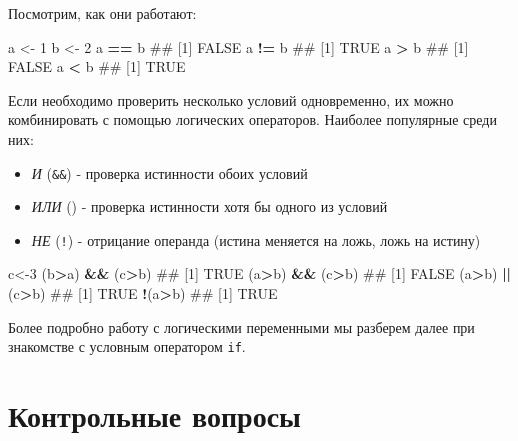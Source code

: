 \documentclass[]{book}
\newenvironment{Shaded}{\begin{snugshade}}{\end{snugshade}}
\newcommand{\DecValTok}[1]{\textcolor[rgb]{0.00,0.00,0.81}{#1}}
\newcommand{\StringTok}[1]{\textcolor[rgb]{0.31,0.60,0.02}{#1}}
\newcommand{\OperatorTok}[1]{\textcolor[rgb]{0.81,0.36,0.00}{\textbf{#1}}}
\newcommand{\NormalTok}[1]{#1}
\providecommand{\tightlist}{%
  \setlength{\itemsep}{0pt}\setlength{\parskip}{0pt}}
\begin{document}
Посмотрим, как они работают:

\begin{Shaded}
\begin{Highlighting}[]
\NormalTok{a <-}\StringTok{ }\DecValTok{1}
\NormalTok{b <-}\StringTok{ }\DecValTok{2}
\NormalTok{a }\OperatorTok{==}\StringTok{ }\NormalTok{b}
\NormalTok{## [1] FALSE}
\NormalTok{a }\OperatorTok{!=}\StringTok{ }\NormalTok{b}
\NormalTok{## [1] TRUE}
\NormalTok{a }\OperatorTok{>}\StringTok{ }\NormalTok{b}
\NormalTok{## [1] FALSE}
\NormalTok{a }\OperatorTok{<}\StringTok{ }\NormalTok{b}
\NormalTok{## [1] TRUE}
\end{Highlighting}
\end{Shaded}

Если необходимо проверить несколько условий одновременно, их можно
комбинировать с помощью логических операторов. Наиболее популярные среди
них:

\begin{itemize}
\tightlist
\item
  \emph{И} (\texttt{\&\&}) - проверка истинности обоих условий
\item
  \emph{ИЛИ} (\texttt{\textbar{}\textbar{}}) - проверка истинности хотя
  бы одного из условий
\item
  \emph{НЕ} (\texttt{!}) - отрицание операнда (истина меняется на ложь,
  ложь на истину)
\end{itemize}

\begin{Shaded}
\begin{Highlighting}[]
\NormalTok{c<-}\DecValTok{3}
\NormalTok{(b}\OperatorTok{>}\NormalTok{a) }\OperatorTok{&&}\StringTok{ }\NormalTok{(c}\OperatorTok{>}\NormalTok{b)}
\NormalTok{## [1] TRUE}
\NormalTok{(a}\OperatorTok{>}\NormalTok{b) }\OperatorTok{&&}\StringTok{ }\NormalTok{(c}\OperatorTok{>}\NormalTok{b)}
\NormalTok{## [1] FALSE}
\NormalTok{(a}\OperatorTok{>}\NormalTok{b) }\OperatorTok{||}\StringTok{ }\NormalTok{(c}\OperatorTok{>}\NormalTok{b)}
\NormalTok{## [1] TRUE}
\OperatorTok{!}\NormalTok{(a}\OperatorTok{>}\NormalTok{b)}
\NormalTok{## [1] TRUE}
\end{Highlighting}
\end{Shaded}

Более подробно работу с логическими переменными мы разберем далее при
знакомстве с условным оператором \texttt{if}.

\section{Контрольные вопросы}\label{questions_basics}
\end{document}
